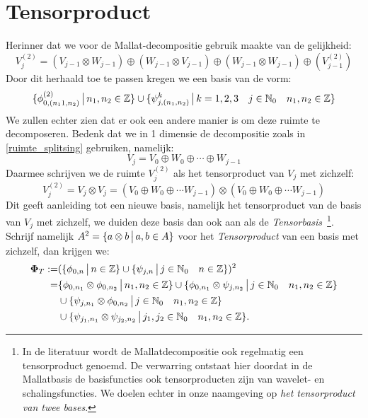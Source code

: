 \section{Tensorproduct}
\label{tensorS}

Herinner dat we voor de Mallat-decompositie gebruik maakte van de gelijkheid:
\[
V_{j}^{(2)} = (V_{j-1}\otimes W_{j-1}) \oplus (W_{j-1}\otimes V_{j-1}) \oplus
(W_{j-1}\otimes W_{j-1}) \oplus (V^{(2)}_{j-1})
\]
Door dit herhaald toe te passen kregen we een basis van de vorm:
\[
\{\phi^{(2)}_{0,(n_11,n_2)}\,\big|\, n_1,n_2\in\mathbb{Z}\}\cup
\{\psi^k_{j,(n_1,n_2)} \,\big|\, k=1,2,3\quad j\in \mathbb{N}_0 \quad n_1,n_2\in\mathbb{Z}\}
\]
We zullen echter zien dat er ook een andere manier is om deze ruimte te decomposeren.
Bedenk dat we in 1 dimensie de decompositie zoals in \eqref{ruimte_splitsing} gebruiken, namelijk:
\[
V_j = V_0 \oplus W_0 \oplus \cdots \oplus W_{j-1}
\]
Daarmee schrijven we de ruimte $V^{(2)}_j$ als het tensorproduct van $V_j$ met zichzelf:
\[
V^{(2)}_j = V_j\otimes V_j = (V_0\oplus W_0\oplus\cdots W_{j-1})\otimes(V_0\oplus W_0\oplus\cdots W_{j-1})
\]
Dit geeft aanleiding tot een nieuwe basis, namelijk het tensorproduct van de basis van $V_j$ met zichzelf,
we duiden deze basis dan ook aan als de \emph{Tensorbasis}~\footnote{In de literatuur wordt de Mallatdecompositie ook regelmatig een tensorproduct genoemd. 
De verwarring ontstaat hier doordat in de Mallatbasis de basisfuncties ook tensorproducten zijn van wavelet- 
en schalingsfuncties. We doelen echter in onze naamgeving op \emph{het tensorproduct van twee bases}.}.
Schrijf namelijk $A^2 = \{a\otimes b \,\big|\, a,b\in A\}$ voor het \emph{Tensorproduct} van een basis met zichzelf,
dan krijgen we:
\begin{equation}
  \label{tensor_basis_def}
  \begin{split}
    \boldsymbol\Phi_T :=& (\{\phi_{0,n}\,\big|\, n\in\mathbb{Z}\}\cup \{\psi_{j,n}\,\big|\, j\in\mathbb{N}_0\quad n\in\mathbb{Z}\})^2\\
                        =& \{\phi_{0,n_1}\otimes\phi_{0,n_2}\,\big|\, n_1,n_2\in\mathbb{Z}\} 
                        \cup \{\phi_{0,n_1}\otimes\psi_{j,n_2}\,\big|\, j\in\mathbb{N}_0\quad n_1,n_2\in\mathbb{Z}\} \\    
                         & \cup \{\psi_{j,n_1}\otimes\phi_{0,n_2}\,\big|\, j\in\mathbb{N}_0\quad n_1,n_2\in\mathbb{Z}\} \\
                         & \cup \{\psi_{j_1,n_1}\otimes\psi_{j_2,n_2}\,\big|\, j_1,j_2\in\mathbb{N}_0\quad n_1,n_2\in\mathbb{Z}\}.
  \end{split}
\end{equation}

